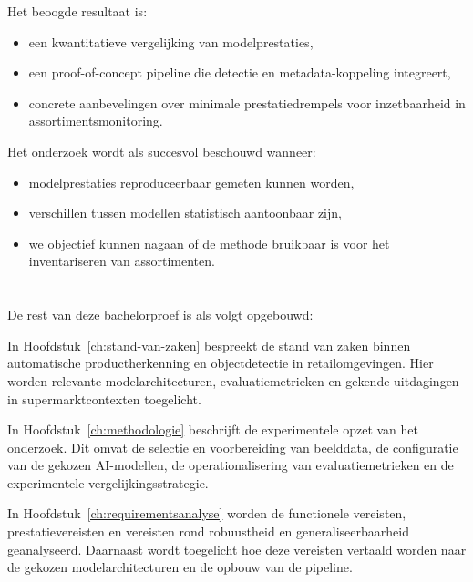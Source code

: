 Het beoogde resultaat is:
\begin{itemize}
    \item een kwantitatieve vergelijking van modelprestaties,
    \item een proof-of-concept pipeline die detectie en metadata-koppeling integreert,
    \item concrete aanbevelingen over minimale prestatiedrempels voor inzetbaarheid in assortimentsmonitoring.
\end{itemize}

Het onderzoek wordt als succesvol beschouwd wanneer:
\begin{itemize}
    \item modelprestaties reproduceerbaar gemeten kunnen worden,
    \item verschillen tussen modellen statistisch aantoonbaar zijn,
    \item we objectief kunnen nagaan of de methode bruikbaar is voor het inventariseren van assortimenten.
\end{itemize}

\section{}%
\label{sec:opzet-bachelorproef}

De rest van deze bachelorproef is als volgt opgebouwd:

In Hoofdstuk~\ref{ch:stand-van-zaken} bespreekt de stand van zaken binnen automatische productherkenning en objectdetectie in retailomgevingen. Hier worden relevante modelarchitecturen, evaluatiemetrieken en gekende uitdagingen in supermarktcontexten toegelicht.

In Hoofdstuk~\ref{ch:methodologie} beschrijft de experimentele opzet van het onderzoek. Dit omvat de selectie en voorbereiding van beelddata, de configuratie van de gekozen AI-modellen, de operationalisering van evaluatiemetrieken en de experimentele vergelijkingsstrategie.


In Hoofdstuk~\ref{ch:requirementsanalyse} worden de functionele vereisten, prestatievereisten en vereisten rond robuustheid en generaliseerbaarheid geanalyseerd. Daarnaast wordt toegelicht hoe deze vereisten vertaald worden naar de gekozen modelarchitecturen en de opbouw van de pipeline.

